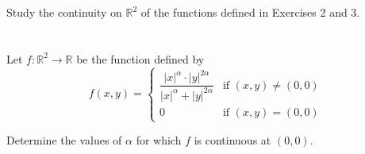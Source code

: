 \documentclass[12pt]{article}
\begin{document}
\section{}
Study the continuity on $\mathbb{R}^2$ of the functions defined in Exercises 2 and 3.

\begin{correctionbox}
\end{correctionbox}

\section{}
Let $f : \mathbb{R}^2 \to \mathbb{R}$ be the function defined by
$$f(x, y) = \begin{cases}
\dfrac{|x|^\alpha \cdot |y|^{2\alpha}}{|x|^\alpha + |y|^{2\alpha}} & \text{if } (x, y) \neq (0, 0) \\[0.5em]
0 & \text{if } (x, y) = (0, 0)
\end{cases}$$

Determine the values of $\alpha$ for which $f$ is continuous at $(0, 0)$.
\end{document}
